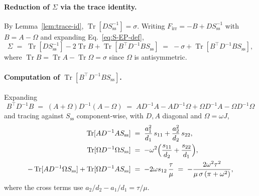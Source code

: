 \documentclass[%
 reprint,
 superscriptaddress,
 nofootinbib,
 nobibnotes,
 amsmath,amssymb,
 aps,
 prl,
 floatfix,
]{revtex4-2}
\newcommand{\Sss}{S_{\mathrm{ss}}}
\newcommand{\Firr}{F_{\mathrm{irr}}}
\newcommand{\Tr}{\operatorname{Tr}}
\begin{document}
\paragraph{Reduction of $\Sigma$ via the trace identity.}
By Lemma~\ref{lem:trace-id}, $\Tr[D \Sss^{-1}] = \sigma$. Writing $\Firr = -B + D\Sss^{-1}$ with $B = A - \Omega$ and expanding Eq.~\eqref{eq:S-EP-def},
\[
\Sigma \;=\; \Tr[D \Sss^{-1}] - 2 \Tr B + \Tr[B^\top D^{-1} B \Sss] \;=\; -\sigma + \Tr[B^\top D^{-1} B \Sss],
\]
where $\Tr B = \Tr A - \Tr \Omega = \sigma$ since $\Omega$ is antisymmetric.

\paragraph{Computation of $\Tr[B^\top D^{-1} B \Sss]$.}
Expanding
\[
B^\top D^{-1} B \;=\; (A + \Omega) D^{-1} (A - \Omega) \;=\; A D^{-1} A - A D^{-1} \Omega + \Omega D^{-1} A - \Omega D^{-1} \Omega
\]
and tracing against $\Sss$ component-wise, with $D, A$ diagonal and $\Omega = \omega J$,
\begin{align*}
\Tr[A D^{-1} A \Sss] &\;=\; \frac{a_1^2}{d_1}\,s_{11} + \frac{a_2^2}{d_2}\,s_{22}, \\
\Tr[\Omega D^{-1} \Omega \Sss] &\;=\; -\omega^2 \Bigl(\frac{s_{11}}{d_2} + \frac{s_{22}}{d_1}\Bigr), \\
-\Tr[A D^{-1} \Omega \Sss] + \Tr[\Omega D^{-1} A \Sss] &\;=\; -2 \omega s_{12} \,\frac{\tau}{\mu} \;=\; -\frac{2 \omega^2 \tau^2}{\mu\,\sigma\,(\pi + \omega^2)},
\end{align*}
where the cross terms use $a_2/d_2 - a_1/d_1 = \tau/\mu$.
\end{document}

